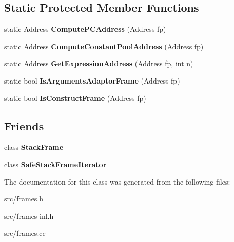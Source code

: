 \subsection*{Static Protected Member Functions}
\begin{DoxyCompactItemize}
\item 
\hypertarget{classv8_1_1internal_1_1_standard_frame_aeff1e57ce047c0318f1f8260c9680c7b}{}static Address {\bfseries Compute\+P\+C\+Address} (Address fp)\label{classv8_1_1internal_1_1_standard_frame_aeff1e57ce047c0318f1f8260c9680c7b}

\item 
\hypertarget{classv8_1_1internal_1_1_standard_frame_a3f8156bbb0acef720b9123a7c0e34bfc}{}static Address {\bfseries Compute\+Constant\+Pool\+Address} (Address fp)\label{classv8_1_1internal_1_1_standard_frame_a3f8156bbb0acef720b9123a7c0e34bfc}

\item 
\hypertarget{classv8_1_1internal_1_1_standard_frame_a9a9c0b625ccdd95f7dc4399653dbd164}{}static Address {\bfseries Get\+Expression\+Address} (Address fp, int n)\label{classv8_1_1internal_1_1_standard_frame_a9a9c0b625ccdd95f7dc4399653dbd164}

\item 
\hypertarget{classv8_1_1internal_1_1_standard_frame_a43bc4f67c3fdff50657cc93e0d83f0a4}{}static bool {\bfseries Is\+Arguments\+Adaptor\+Frame} (Address fp)\label{classv8_1_1internal_1_1_standard_frame_a43bc4f67c3fdff50657cc93e0d83f0a4}

\item 
\hypertarget{classv8_1_1internal_1_1_standard_frame_afc0b10707c929797c6e3448714e73bbf}{}static bool {\bfseries Is\+Construct\+Frame} (Address fp)\label{classv8_1_1internal_1_1_standard_frame_afc0b10707c929797c6e3448714e73bbf}

\end{DoxyCompactItemize}
\subsection*{Friends}
\begin{DoxyCompactItemize}
\item 
\hypertarget{classv8_1_1internal_1_1_standard_frame_a97d8ed08ddcf9dcc973f7e29b74a992f}{}class {\bfseries Stack\+Frame}\label{classv8_1_1internal_1_1_standard_frame_a97d8ed08ddcf9dcc973f7e29b74a992f}

\item 
\hypertarget{classv8_1_1internal_1_1_standard_frame_aa1c3e6274807549ee11be5be6cd1ae62}{}class {\bfseries Safe\+Stack\+Frame\+Iterator}\label{classv8_1_1internal_1_1_standard_frame_aa1c3e6274807549ee11be5be6cd1ae62}

\end{DoxyCompactItemize}


The documentation for this class was generated from the following files\+:\begin{DoxyCompactItemize}
\item 
src/frames.\+h\item 
src/frames-\/inl.\+h\item 
src/frames.\+cc\end{DoxyCompactItemize}
